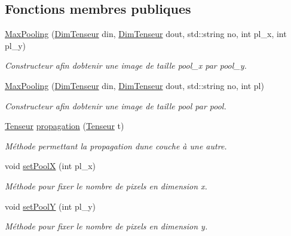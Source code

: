 \subsection*{Fonctions membres publiques}
\begin{DoxyCompactItemize}
\item 
\mbox{\label{classMaxPooling_aa26ff6fb01b361da3e57dfe77131a20a}} 
\hyperlink{classMaxPooling_aa26ff6fb01b361da3e57dfe77131a20a}{Max\+Pooling} (\hyperlink{classDimTenseur}{Dim\+Tenseur} din, \hyperlink{classDimTenseur}{Dim\+Tenseur} dout, std\+::string no, int pl\+\_\+x, int pl\+\_\+y)
\begin{DoxyCompactList}\small\item\em Constructeur afin d\textquotesingle{}obtenir une image de taille pool\+\_\+x par pool\+\_\+y. \end{DoxyCompactList}\item 
\mbox{\label{classMaxPooling_a49e6a67705aacebcc8a58a4d73cd7c58}} 
\hyperlink{classMaxPooling_a49e6a67705aacebcc8a58a4d73cd7c58}{Max\+Pooling} (\hyperlink{classDimTenseur}{Dim\+Tenseur} din, \hyperlink{classDimTenseur}{Dim\+Tenseur} dout, std\+::string no, int pl)
\begin{DoxyCompactList}\small\item\em Constructeur afin d\textquotesingle{}obtenir une image de taille pool par pool. \end{DoxyCompactList}\item 
\hyperlink{classTenseur}{Tenseur} \hyperlink{classMaxPooling_a48e0258bf1f949853cfceb2726035fb8}{propagation} (\hyperlink{classTenseur}{Tenseur} t)
\begin{DoxyCompactList}\small\item\em Méthode permettant la propagation d\textquotesingle{}une couche à une autre. \end{DoxyCompactList}\item 
void \hyperlink{classMaxPooling_ae70dd14b2ebe5963b3a6904ca86857bc}{set\+PoolX} (int pl\+\_\+x)
\begin{DoxyCompactList}\small\item\em Méthode pour fixer le nombre de pixels en dimension x. \end{DoxyCompactList}\item 
void \hyperlink{classMaxPooling_abf21b8f9da67780af60a588a543f7a1b}{set\+PoolY} (int pl\+\_\+y)
\begin{DoxyCompactList}\small\item\em Méthode pour fixer le nombre de pixels en dimension y. \end{DoxyCompactList}\item 

\end{DoxyCompactItemize}
